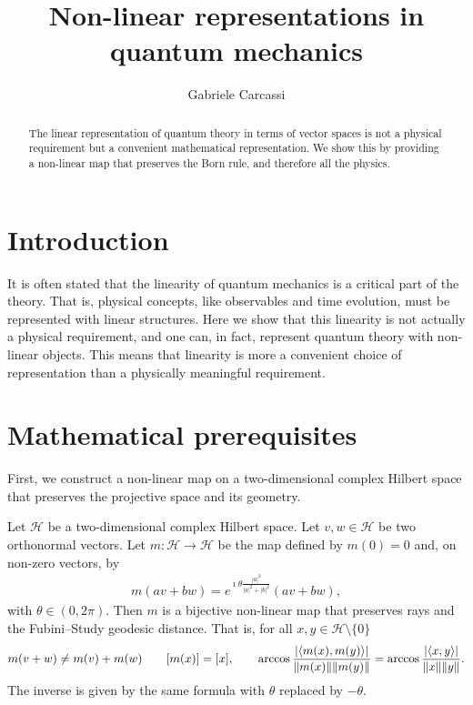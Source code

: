 \documentclass{techbrief}
\title{Non-linear representations in quantum mechanics}
\author{Gabriele Carcassi}
\begin{document}
	
\maketitle
	
\begin{abstract}
	The linear representation of quantum theory in terms of vector spaces is not a physical requirement but a convenient mathematical representation. We show this by providing a non-linear map that preserves the Born rule, and therefore all the physics.
\end{abstract}

\section{Introduction}

It is often stated that the linearity of quantum mechanics is a critical part of the theory. That is, physical concepts, like observables and time evolution, must be represented with linear structures. Here we show that this linearity is not actually a physical requirement, and one can, in fact, represent quantum theory with non-linear objects. This means that linearity is more a convenient choice of representation than a physically meaningful requirement.

\section{Mathematical prerequisites}

First, we construct a non-linear map on a two-dimensional complex Hilbert space that preserves the projective space and its geometry.

\begin{prop}\label{nonlinearMap}
	Let $\mathcal{H}$ be a two-dimensional complex Hilbert space. Let $v, w \in \mathcal{H}$ be two orthonormal vectors. Let $m : \mathcal{H} \to \mathcal{H}$ be the map defined by $m(0) = 0$ and, on non-zero vectors, by
	\begin{equation}
		\begin{aligned}
			m(a v + b w) = e^{\imath \theta \frac{|a|^2}{|a|^2+|b|^2}} ( a v + b w),
		\end{aligned}
	\end{equation}
	with $\theta \in (0, 2\pi)$. Then $m$ is a bijective non-linear map that preserves rays and the Fubini--Study geodesic distance. That is, for all $x,y \in \mathcal{H} \setminus \{0\}$
	$$
	m(v+w)\neq m(v)+m(w)
	\qquad
	[m(x)]=[x],
	\qquad
	\arccos \frac{|\langle m(x),m(y)\rangle|}{\|m(x)\|\|m(y)\|}=\arccos \frac{|\langle x,y\rangle|}{\|x\|\|y\|}.
	$$
	The inverse is given by the same formula with $\theta$ replaced by $- \theta$.
\end{prop}
\end{document}
